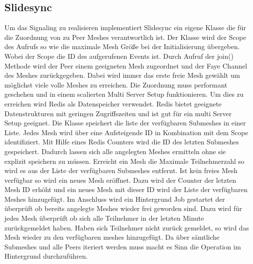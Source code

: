 \begin{description}

\subsection{Slidesync}
Um das Signaling zu realisieren implementiert Slidesync ein eigene Klasse die für die Zuordnung von \clients zu Peer Meshes verantwortlich ist. Der Klasse wird der Scope des Aufrufs so wie die maximale Mesh Größe bei der Initialisierung übergeben. Wobei der Scope die ID des aufgerufenen Events ist. Durch Aufruf der join() Methode wird der Peer einem geeigneten Mesh zugeordnet und der Faye Channel des Meshes zurückgegeben. Dabei wird immer das erste freie Mesh gewählt um möglichst viele volle Meshes zu erreichen. 
Die Zuordnung muss performant geschehen und in einem scalierten Multi Server Setup funktionieren. Um dies zu erreichen wird Redis als Datenspeicher verwendet. Redis bietet geeignete Datenstrukturen mit geringen Zugriffszeiten und ist gut für ein multi Server Setup geeignet. 
Die Klasse speichert die liste der verfügbaren Submeshes in einer Liste. Jedes Mesh wird über eine Aufsteigende ID in Kombination mit dem Scope identifiziert. Mit Hilfe eines Redis Counters wird die ID des letzten Submeshes gespeichert. Dadurch lassen sich alle angelegten Meshes ermitteln ohne sie explizit speichern zu müssen. Erreicht ein Mesh die Maximale Teilnehmerzahl so wird es aus der Liste der verfügbaren Submeshes entfernt. Ist kein freies Mesh verfügbar so wird ein neues Mesh eröffnet. Dazu wird der Counter der letzten Mesh ID erhöht und ein neues Mesh mit dieser ID wird der Liste der verfügbaren Meshes hinzugefügt. Im Anschluss wird ein Hintergrund Job gestartet der überprüft ob bereits angelegte Meshes wieder frei geworden sind. Dazu wird für jedes Mesh überprüft ob sich alle Teilnehmer in der letzten Minute zurückgemeldet haben. Haben sich Teilnehmer nicht zurück gemeldet, so wird das Mesh wieder zu den verfügbaren meshes hinzugefügt. Da über sämtliche Submeshes und alle Peers iteriert werden muss macht es Sinn die Operation im Hintergrund durchzuführen.

\end{description}
